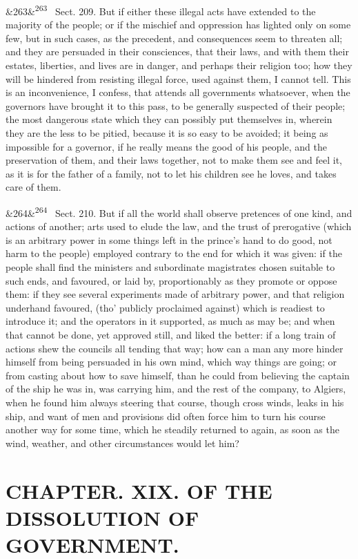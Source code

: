 \documentclass[12pt]{article}
\newcommand{\para}[1][]{\par\noindent\ifx&#1&\else\textsuperscript{\footnotesize #1}~\fi}
\begin{document}
\para[263] Sect. 209. But if either these illegal acts have extended to the majority of the people; or if the mischief and oppression has lighted only on some few, but in such cases, as the precedent, and consequences seem to threaten all; and they are persuaded in their consciences, that their laws, and with them their estates, liberties, and lives are in danger, and perhaps their religion too; how they will be hindered from resisting illegal force, used against them, I cannot tell. This is an inconvenience, I confess, that attends all governments whatsoever, when the governors have brought it to this pass, to be generally suspected of their people; the most dangerous state which they can possibly put themselves in, wherein they are the less to be pitied, because it is so easy to be avoided; it being as impossible for a governor, if he really means the good of his people, and the preservation of them, and their laws together, not to make them see and feel it, as it is for the father of a family, not to let his children see he loves, and takes care of them.

\para[264] Sect. 210. But if all the world shall observe pretences of one kind, and actions of another; arts used to elude the law, and the trust of prerogative (which is an arbitrary power in some things left in the prince's hand to do good, not harm to the people) employed contrary to the end for which it was given: if the people shall find the ministers and subordinate magistrates chosen suitable to such ends, and favoured, or laid by, proportionably as they promote or oppose them: if they see several experiments made of arbitrary power, and that religion underhand favoured, (tho' publicly proclaimed against) which is readiest to introduce it; and the operators in it supported, as much as may be; and when that cannot be done, yet approved still, and liked the better: if a long train of actions shew the councils all tending that way; how can a man any more hinder himself from being persuaded in his own mind, which way things are going; or from casting about how to save himself, than he could from believing the captain of the ship he was in, was carrying him, and the rest of the company, to Algiers, when he found him always steering that course, though cross winds, leaks in his ship, and want of men and provisions did often force him to turn his course another way for some time, which he steadily returned to again, as soon as the wind, weather, and other circumstances would let him?

\section*{CHAPTER. XIX. OF THE DISSOLUTION OF GOVERNMENT.}
\end{document}
